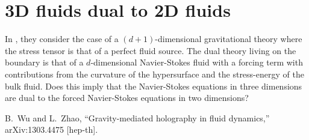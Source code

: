\documentclass[12pt,a4paper]{article}
\begin{document}
\section{3D fluids dual to 2D fluids}

In \cite{Wu:2013mda}, they consider the case of a $(d+1)$-dimensional gravitational theory where the stress tensor is that of a perfect fluid source. The dual theory living on the boundary is that of a $d$-dimensional Navier-Stokes fluid with a forcing term with contributions from the curvature of the hypersurface and the stress-energy of the bulk fluid. Does this imply that the Navier-Stokes equations in three dimensions are dual to the forced Navier-Stokes equations in two dimensions?

\begin{thebibliography}{99}

  B.~Wu and L.~Zhao,
  ``Gravity-mediated holography in fluid dynamics,''
  arXiv:1303.4475 [hep-th].

\end{thebibliography}
\end{document}
